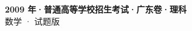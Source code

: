 \documentclass[zihao=-4, a4paper]{ctexart}
\begin{document}
\begin{center}
  {\Large\bfseries 2009 年·普通高等学校招生考试·广东卷·理科}\\[4pt]
  {\large 数学 · 试题版}
\end{center}
\medskip
{}

\end{document}
